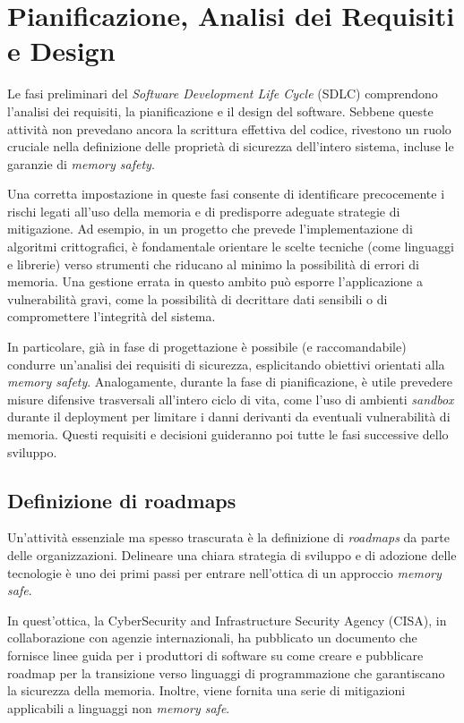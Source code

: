 \section{Pianificazione, Analisi dei Requisiti e Design}
\label{sec:planning_requirements_design}

Le fasi preliminari del \textit{Software Development Life Cycle} (SDLC)
comprendono l'analisi dei requisiti, la pianificazione e il design del software.
Sebbene queste attività non prevedano ancora la scrittura effettiva del codice, rivestono
un ruolo cruciale nella definizione delle proprietà di sicurezza dell'intero sistema,
incluse le garanzie di \textit{memory safety}.

Una corretta impostazione in queste fasi consente di identificare precocemente i
rischi legati all'uso della memoria e di predisporre adeguate strategie di mitigazione.
Ad esempio, in un progetto che prevede l'implementazione di algoritmi crittografici,
è fondamentale orientare le scelte tecniche (come linguaggi e librerie) verso
strumenti che riducano al minimo la possibilità di errori di memoria. Una gestione
errata in questo ambito può esporre l'applicazione a vulnerabilità gravi, come
la possibilità di decrittare dati sensibili o di compromettere l'integrità del
sistema.

In particolare, già in fase di progettazione è possibile (e raccomandabile) condurre
un'analisi dei requisiti di sicurezza, esplicitando obiettivi orientati alla
\textit{memory safety}. Analogamente, durante la fase di pianificazione, è utile
prevedere misure difensive trasversali all'intero ciclo di vita, come l'uso di ambienti
\textit{sandbox} durante il deployment per limitare i danni derivanti da
eventuali vulnerabilità di memoria. Questi requisiti e decisioni guideranno poi tutte
le fasi successive dello sviluppo.

\subsection{Definizione di roadmaps}
\label{sec:roadmap} Un'attività essenziale ma spesso trascurata è la definizione
di \textit{roadmaps} da parte delle organizzazioni. Delineare una chiara strategia
di sviluppo e di adozione delle tecnologie è uno dei primi passi per entrare nell'ottica
di un approccio \textit{memory safe}.

In quest'ottica, la CyberSecurity and Infrastructure Security Agency (CISA), in
collaborazione con agenzie internazionali, ha pubblicato un documento\cite{memory_safe_roadmaps}
che fornisce linee guida per i produttori di software su come creare e
pubblicare roadmap per la transizione verso linguaggi di programmazione che
garantiscano la sicurezza della memoria. Inoltre, viene fornita una serie di
mitigazioni applicabili a linguaggi non \textit{memory safe}.

